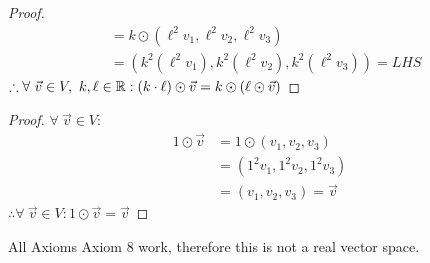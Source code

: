 \begin{enumerate}
\begin{proof}
\begin{align*}
                                         & = k \odot (\ell^2v_1,\ell^2v_2,\ell^2v_3)                         \\
                                         & = (k^2(\ell^2v_1),k^2(\ell^2v_2),k^2(\ell^2v_3)) = LHS
    \end{align*}
    $\therefore \forall~\vec{v} \in V,~k,\ell \in \mathbb{R}: (k \cdot \ell) \odot \vec{v} = k \odot (\ell \odot \vec{v})$
  \end{proof}
  \begin{proof}
    $\forall~\vec{v} \in V$:
    \begin{align*}
      1 \odot \vec{v} & = 1 \odot (v_1,v_2,v_3)   \\
                      & = (1^2v_1,1^2v_2,1^2v_3)  \\
                      & = (v_1,v_2,v_3) = \vec{v}
    \end{align*}
    $\therefore \forall~\vec{v} \in V: 1 \odot \vec{v} = \vec{v}$
  \end{proof}
\end{enumerate}
All Axioms  Axiom 8 work, therefore this is not a real vector space.

